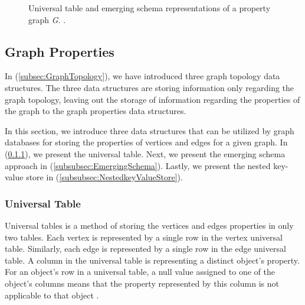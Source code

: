 {\begin{figure}[H]
{        \label{fig:VertexEmergingSchema}
    }
\centering
    \caption{Universal table and emerging schema representations of a property graph \textit{G}. \cite{DBLP:journals/corr/ParadiesLB14}.}
    \label{fig:GraphProperties_logical}
\end{figure}

\subsection{Graph Properties}
\label{subsec:GraphProperties}

In (\ref{subsec:GraphTopology}), we have introduced three graph topology data structures. The three data structures are storing information only regarding the graph topology, leaving out the storage of information regarding the properties of the graph to the graph properties data structures. 

In this section, we introduce three data structures that can be utilized by graph databases for storing the properties of vertices and edges for a given graph. In (\ref{subsubsec:UniversalTable}), we present the universal table. Next, we present the emerging schema approach in (\ref{subsubsec:EmergingSchema}). Lastly, we present the nested key-value store in (\ref{subsubsec:NestedkeyValueStore}).

\subsubsection{Universal Table}
\label{subsubsec:UniversalTable}

Universal tables is a method of storing the vertices and edges properties in only two tables. Each vertex is represented by a single row in the vertex universal table. Similarly, each edge is represented by a single row in the edge universal table. A column in the universal table is representing a distinct object's property. For an object's row in a universal table, a null value assigned to one of the object's columns means that the property represented by this column is not applicable to that object \cite{Paradies2017}.

}
